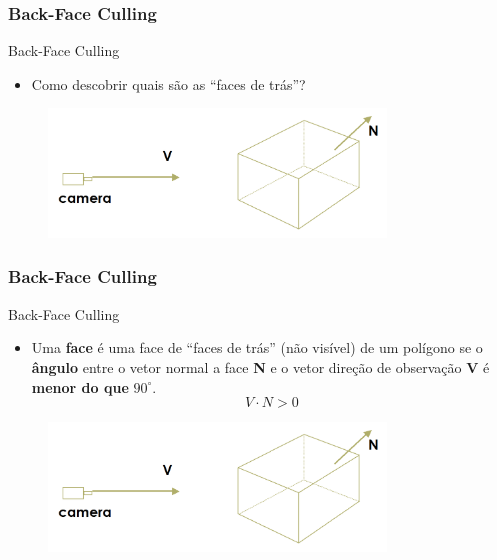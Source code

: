 \documentclass{beamer}
\begin{document}
\begin{frame}
\frametitle{Back-Face Culling}

		\begin{block}{Back-Face Culling}
			\begin{itemize}	
				\item Como descobrir quais são as ``faces de trás''?
			\end{itemize}
		\end{block}


		\begin{figure}[!h]
			\begin{center}
				\includegraphics[width=0.8\textwidth]{Figures/CamCub}
			\end{center}
		\end{figure}
		
\end{frame}

\begin{frame}
\frametitle{Back-Face Culling}

		\begin{block}{Back-Face Culling}
			\begin{itemize}	
				\item Uma \textbf{face} é uma face de ``faces de trás'' (não visível) de um polígono se o \textbf{ângulo} entre o vetor normal a face \textbf{N} e o vetor direção de observação \textbf{V} é \textbf{menor do que} $90^\circ $.\\
				\begin{equation*}
					V \cdot N > 0
				\end{equation*}				 
			\end{itemize}
		\end{block}


		\begin{figure}[!h]
			\begin{center}
				\includegraphics[width=0.8\textwidth]{Figures/CamCub}
			\end{center}
		\end{figure}
		
\end{frame}


\end{document}
